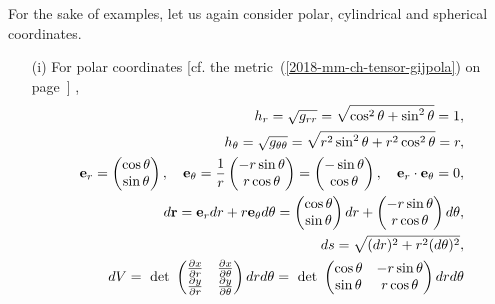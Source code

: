 {
\color{blue}
\bexample
For the sake of examples, let us again consider polar, cylindrical and spherical coordinates.
\begin{itemize}
\item[(i)]
For polar coordinates [cf. the metric~(\ref{2018-mm-ch-tensor-gijpola}) on page~\pageref{2018-mm-ch-tensor-gijpola}] ,
\begin{equation}
\begin{split}
h_r=\sqrt{g_{rr}}=\sqrt{ \cos^2\theta + \sin^2 \theta }=1,\\
h_\theta=\sqrt{g_{\theta \theta}}=\sqrt{ r^2 \sin^2\theta + r^2 \cos^2 \theta }=r, \\
{\bf e}_r =
\begin{pmatrix}
\cos \theta \\ \sin \theta
\end{pmatrix}
,\quad
{\bf e}_\theta = \frac{1}{r}
\begin{pmatrix}
- r \sin \theta \\ r \cos \theta
\end{pmatrix}
=
\begin{pmatrix}
- \sin \theta \\ \cos \theta
\end{pmatrix}
,\quad
{\bf e}_r \cdot {\bf e}_\theta = 0
,
\\
d{\bf r}= {\bf e}_r dr + r {\bf e}_\theta d \theta
=  \begin{pmatrix}
\cos \theta \\ \sin \theta
\end{pmatrix}  dr
+
\begin{pmatrix}
- r\sin \theta \\ r\cos \theta
\end{pmatrix} d \theta ,
\\
ds= \sqrt{ (dr)^2+ r^2 (d \theta )^2},
\\
dV
=\text{ det }
\begin{pmatrix}
\frac{\partial x}{\partial r} & \frac{\partial x}{\partial \theta} \\
\frac{\partial y}{\partial r} & \frac{\partial y}{\partial \theta} \\
\end{pmatrix}
dr d \theta
=\text{ det }
\begin{pmatrix}
\cos \theta &  -r \sin \theta  \\
\sin \theta & r \cos \theta  \\
\end{pmatrix}
dr d \theta
\\

\end{split}
\end{equation}
\end{itemize}}
